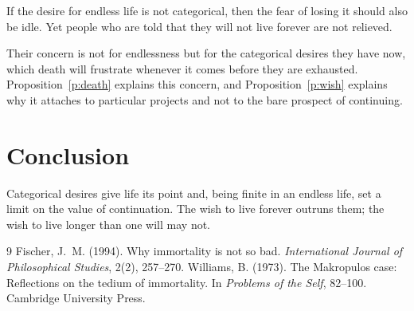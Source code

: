 \documentclass{situationist-preprint}
\begin{document}
\begin{objection}
If the desire for endless life is not categorical, then the fear of losing it should also be idle. Yet people who are told that they will not live forever are not relieved.
\end{objection}

\begin{reply}
Their concern is not for endlessness but for the categorical desires they have now, which death will frustrate whenever it comes before they are exhausted. Proposition~\ref{p:death} explains this concern, and Proposition~\ref{p:wish} explains why it attaches to particular projects and not to the bare prospect of continuing.
\end{reply}

\section{Conclusion}

Categorical desires give life its point and, being finite in an endless life, set a limit on the value of continuation. The wish to live forever outruns them; the wish to live longer than one will may not.

\begin{thebibliography}{9}\small
{} Fischer, J.~M. (1994). Why immortality is not so bad. \emph{International Journal of Philosophical Studies}, 2(2), 257--270.
 Williams, B. (1973). The Makropulos case: Reflections on the tedium of immortality. In \emph{Problems of the Self}, 82--100. Cambridge University Press.
\end{thebibliography}
\end{document}
